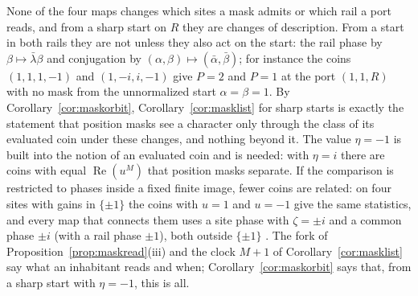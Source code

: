 None of the four maps changes which sites a mask admits or which rail a port reads, and from a sharp start on $R$ they are changes of description. From a start in both rails they are not unless they also act on the start: the rail phase by $\beta\mapsto\bar\lambda\beta$ and conjugation by $(\alpha,\beta)\mapsto(\bar\alpha,\bar\beta)$; for instance the coins $(1,1,1,-1)$ and $(1,-i,i,-1)$ give $P=2$ and $P=1$ at the port $(1,1,R)$ with no mask from the unnormalized start $\alpha=\beta=1$. By Corollary~\ref{cor:maskorbit}, Corollary~\ref{cor:masklist} for sharp starts is exactly the statement that position masks see a character only through the class of its evaluated coin under these changes, and nothing beyond it. The value $\eta=-1$ is built into the notion of an evaluated coin and is needed: with $\eta=i$ there are coins with equal $\operatorname{Re}(u^{M})$ that position masks separate. If the comparison is restricted to phases inside a fixed finite image, fewer coins are related: on four sites with gains in $\{\pm1\}$ the coins with $u=1$ and $u=-1$ give the same statistics, and every map that connects them uses a site phase with $\zeta=\pm i$ and a common phase $\pm i$ (with a rail phase $\pm1$), both outside $\{\pm1\}$ \cite{dgsym}. The fork of Proposition~\ref{prop:maskread}(iii) and the clock $M+1$ of Corollary~\ref{cor:masklist} say what an inhabitant reads and when; Corollary~\ref{cor:maskorbit} says that, from a sharp start with $\eta=-1$, this is all.

